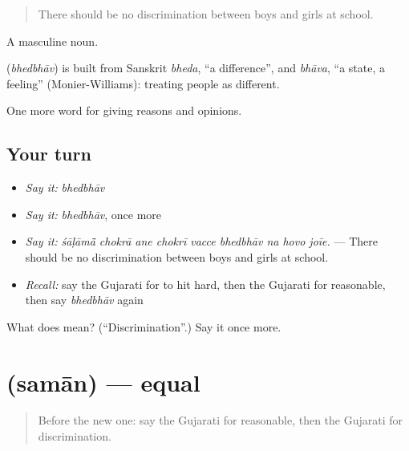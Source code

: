 \begin{quote}
There should be no discrimination between boys and girls at school.
\end{quote}

A masculine noun.

\begin{cousinweb}
\textbf{} (\emph{bhedbhāv}) is built from Sanskrit \emph{bheda}, \textquotedblleft{}a difference\textquotedblright{}, and \emph{bhāva}, \textquotedblleft{}a state, a feeling\textquotedblright{} (Monier-Williams): treating people as different.
\end{cousinweb}

\begin{grammarlens}[title={What you've built}]
One more word for giving reasons and opinions.
\end{grammarlens}

\subsection*{Your turn}
\begin{itemize}
\raggedright
  \item \emph{Say it:} \emph{bhedbhāv}
  \item \emph{Say it:} \emph{bhedbhāv}, once more
  \item \emph{Say it:} \emph{śāḷāmā̃ chokrā ane chokrī vacce bhedbhāv na hovo joīe.} — There should be no discrimination between boys and girls at school.
  \item \emph{Recall:} say the Gujarati for to hit hard, then the Gujarati for reasonable, then say \emph{bhedbhāv} again
\end{itemize}

\begin{tcolorbox}[breakable,colback=teal!4,colframe=teal!35!black,title={Before you move on}]
What does  mean? (\textquotedblleft{}Discrimination\textquotedblright{}.) Say it once more.
\end{tcolorbox}
\section[\texorpdfstring{\gu{સમાન} (samān)}{સમાન (samān)}]{ (samān) — equal}

\label{lesson:GU-C349-saman}



\begin{quote}
Before the new one: say the Gujarati for reasonable, then the Gujarati for discrimination.
\end{quote}

